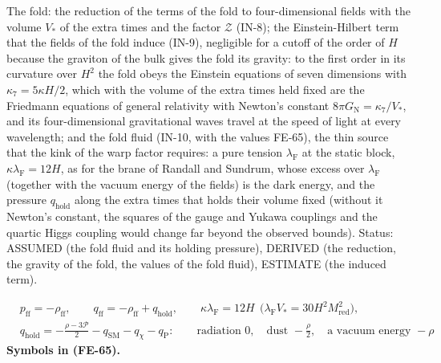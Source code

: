 \documentclass[
  10pt,
]{article}
\begin{document}
The fold: the reduction of the terms of the fold to four-dimensional
fields with the volume \(V_*\) of the extra times and the factor
\(\mathcal{Z}\) (IN-8); the Einstein-Hilbert term that the fields of the
fold induce (IN-9), negligible for a cutoff of the order of \(H\)
because the graviton of the bulk gives the fold its gravity: to the
first order in its curvature over \(H^2\) the fold obeys the Einstein
equations of seven dimensions with \(\kappa_7 = 5\kappa H/2\), which
with the volume of the extra times held fixed are the Friedmann
equations of general relativity with Newton's constant
\(8\pi G_{\mathrm{N}} = \kappa_7/V_*\), and its four-dimensional
gravitational waves travel at the speed of light at every wavelength;
and the fold fluid (IN-10, with the values FE-65), the thin source that
the kink of the warp factor requires: a pure tension
\(\lambda_{\mathrm{F}}\) at the static block,
\(\kappa\lambda_{\mathrm{F}} = 12H\), as for the brane of Randall and
Sundrum, whose excess over \(\lambda_{\mathrm{F}}\) (together with the
vacuum energy of the fields) is the dark energy, and the pressure
\(q_{\mathrm{hold}}\) along the extra times that holds their volume
fixed (without it Newton's constant, the squares of the gauge and Yukawa
couplings and the quartic Higgs coupling would change far beyond the
observed bounds). Status: ASSUMED (the fold fluid and its holding
pressure), DERIVED (the reduction, the gravity of the fold, the values
of the fold fluid), ESTIMATE (the induced term).

\[
\begin{aligned}
&p_{\mathrm{ff}} = -\rho_{\mathrm{ff}},\qquad q_{\mathrm{ff}} = -\rho_{\mathrm{ff}} + q_{\mathrm{hold}},\qquad
 \kappa\lambda_{\mathrm{F}} = 12H\ \ \big(\lambda_{\mathrm{F}}V_* = 30H^2M_{\mathrm{red}}^2\big),\\
&q_{\mathrm{hold}} = -\frac{\rho - 3\mathcal{P}}{2} - q_{\mathrm{SM}} - q_\chi - q_{\mathrm{P}}:\qquad
 \text{radiation } 0,\quad \text{dust } -\frac{\rho}{2},\quad \text{a vacuum energy } -\rho
\end{aligned} \tag{FE-65}
\] \textbf{Symbols in (FE-65).}
\end{document}
